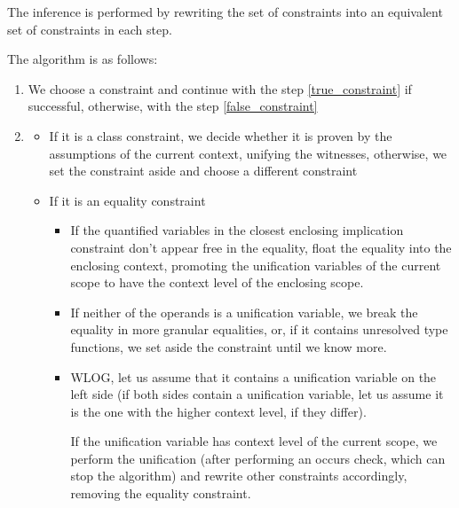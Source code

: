 \begin{defn}
    The inference is performed by rewriting the set of constraints into an equivalent set of constraints in each step.

    The algorithm is as follows:

    \begin{enumerate}
        \item We choose a constraint and continue with the step \ref{true_constraint} if successful, otherwise, with the step \ref{false_constraint} \label{choose_constraint}

        \item \label{true_constraint}
        \begin{itemize}
            \item If it is a class constraint, we decide whether it is proven by the assumptions of the current context, unifying the witnesses, otherwise, we set the constraint aside and choose a different constraint

            \item If it is an equality constraint
            \begin{itemize}
                \item If the quantified variables in the closest enclosing implication constraint don't appear free in the equality, float the equality into the enclosing context, promoting the unification variables of the current scope to have the context level of the enclosing scope.

                \item If neither of the operands is a unification variable, we break the equality in more granular equalities, or, if it contains unresolved type functions, we set aside the constraint until we know more.

                \item WLOG, let us assume that it contains a unification variable on the left side (if both sides contain a unification variable, let us assume it is the one with the higher context level, if they differ).

                If the unification variable has context level of the current scope, we perform the unification (after performing an occurs check, which can stop the algorithm) and rewrite other constraints accordingly, removing the equality constraint.

            \end{itemize}


\end{itemize}
\end{enumerate}
\end{defn}
